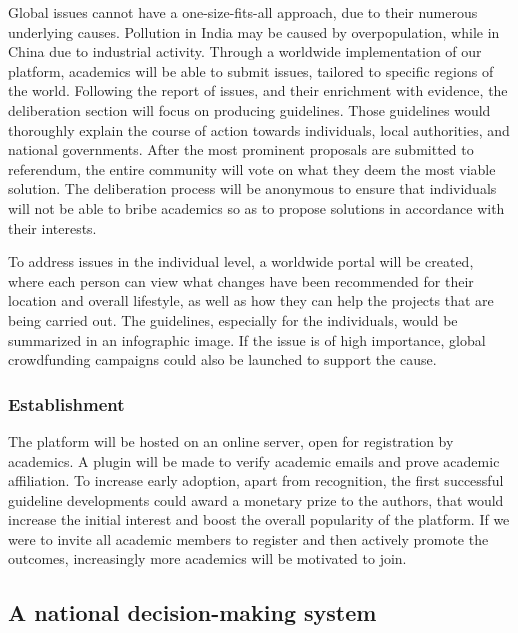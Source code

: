 \documentclass[a4paper,11pt]{article}
\begin{document}
\begin{multicols}{2}
Global issues cannot have a one-size-fits-all approach, due to their numerous underlying causes. Pollution in India may be caused by overpopulation, while in China due to industrial activity. Through a worldwide implementation of our platform, academics will be able to submit issues, tailored to specific regions of the world. Following the report of issues, and their enrichment with evidence, the deliberation section will focus on producing guidelines. Those guidelines would thoroughly explain the course of action towards individuals, local authorities, and national governments. After the most prominent proposals are submitted to referendum, the entire community will vote on what they deem the most viable solution. The deliberation process will be anonymous to ensure that individuals will not be able to bribe academics so as to propose solutions in accordance with their interests.

To address issues in the individual level, a worldwide portal will be created, where each person can view what changes have been recommended for their location and overall lifestyle, as well as how they can help the projects that are being carried out. The guidelines, especially for the individuals, would be summarized in an infographic image. If the issue is of high importance, global crowdfunding campaigns could also be launched to support the cause.

\subsubsection{Establishment} \label{establishmentacademics}

The platform will be hosted on an online server, open for registration by academics. A plugin will be made to verify academic emails and prove academic affiliation. To increase early adoption, apart from recognition, the first successful guideline developments could award a monetary prize to the authors, that would increase the initial interest and boost the overall popularity of the platform. If we were to invite all academic members to register and then actively promote the outcomes, increasingly more academics will be motivated to join.

\subsection{A national decision-making system} \label{national}



\end{multicols}
\end{document}
